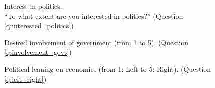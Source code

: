 \begin{figure}[h!] 
    \caption[Interest in politics]{Interest in politics. \\ ``To what extent are you interested in politics?'' (Question \ref{q:interested_politics})}\label{fig:interested_politics}
\end{figure}

\begin{figure}[h!] 
    \caption[Desired involvement of government]{Desired involvement of government (from 1 to 5). (Question \ref{q:involvement_govt})}\label{fig:involvement_govt}
\end{figure}

\begin{figure}[h!] 
    \caption[Political leaning]{Political leaning on economics (from 1: Left to 5: Right). (Question \ref{q:left_right})}\label{fig:left_right}
\end{figure}

